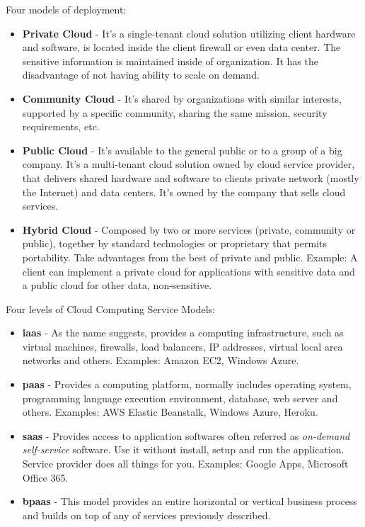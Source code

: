 Four models of deployment:
\begin{itemize}
	\item \textbf{Private Cloud}   - It's a single-tenant cloud solution utilizing client hardware and software, is located inside the client firewall or even data center. The sensitive information is maintained inside of organization. It has the disadvantage of not having ability to scale on demand.
	\item \textbf{Community Cloud} - It’s shared by organizations with similar interests, supported by a specific community, sharing the same mission, security requirements, etc.
	\item \textbf{Public Cloud}    - It's available to the general public or to a group of a big company. It's a multi-tenant cloud solution owned by cloud service provider, that delivers shared hardware and software to clients private network (mostly the Internet) and data centers. It's owned by the company that sells cloud services.

	\item \textbf{Hybrid Cloud}    - Composed by two or more services (private, community or public), together by standard technologies or proprietary that permits portability. Take advantages from the best of private and public. Example: A client can implement a private cloud for applications with sensitive data and a public cloud for other data, non-sensitive.
\end{itemize}

Four levels of Cloud Computing Service Models:

\begin{itemize}
	\item \textbf{\ac{iaas}} - As the name suggests, provides a computing infrastructure, such as virtual machines, firewalls, load balancers, IP addresses, virtual local area networks and others. Examples: Amazon EC2, Windows Azure.

	\item \textbf{\ac{paas}} - Provides a computing platform, normally includes operating system, programming language execution environment, database, web server and others. Examples: AWS Elastic Beanstalk, Windows Azure, Heroku.

	\item \textbf{\ac{saas}} - Provides access to application softwares often referred as \textit{on-demand self-service} software. Use it without install, setup and run the application. Service provider does all things for you. Examples: Google Apps, Microsoft Office 365.

	\item \textbf{\ac{bpaas}} - This model provides an entire horizontal or vertical business process and builds on top of any of services previously described.

\end{itemize}

